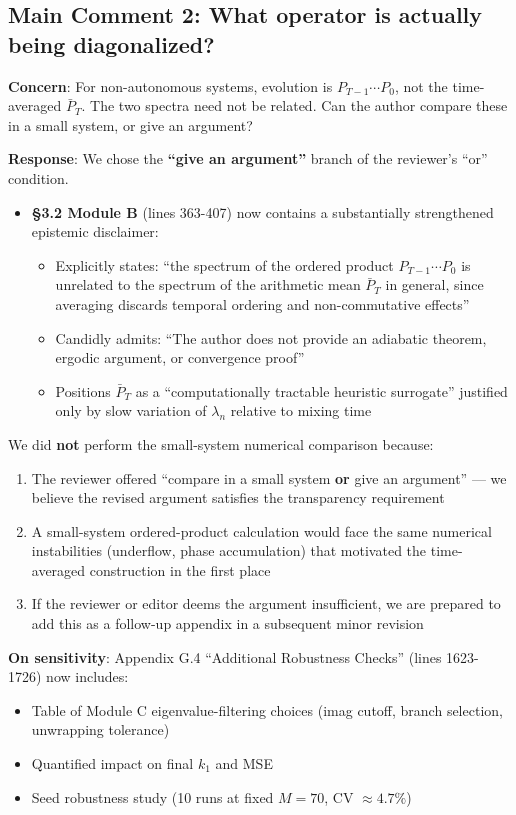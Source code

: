 \documentclass[11pt]{article}
\begin{document}
\subsection*{Main Comment 2: What operator is actually being diagonalized?}

\textbf{Concern}: For non-autonomous systems, evolution is $P_{T-1}\cdots P_0$, not the time-averaged $\bar{P}_T$. The two spectra need not be related. Can the author compare these in a small system, or give an argument?

\textbf{Response}: We chose the \textbf{``give an argument''} branch of the reviewer's ``or'' condition.

\begin{itemize}[leftmargin=2em]
\item \textbf{\S3.2 Module B} (lines 363-407) now contains a substantially strengthened epistemic disclaimer:
\begin{itemize}
\item Explicitly states: ``the spectrum of the ordered product $P_{T-1}\cdots P_0$ is unrelated to the spectrum of the arithmetic mean $\bar{P}_T$ in general, since averaging discards temporal ordering and non-commutative effects''
\item Candidly admits: ``The author does not provide an adiabatic theorem, ergodic argument, or convergence proof''
\item Positions $\bar{P}_T$ as a ``computationally tractable heuristic surrogate'' justified only by slow variation of $\lambda_n$ relative to mixing time
\end{itemize}
\end{itemize}

We did \textbf{not} perform the small-system numerical comparison because:
\begin{enumerate}
\item The reviewer offered ``compare in a small system \textbf{or} give an argument'' --- we believe the revised argument satisfies the transparency requirement
\item A small-system ordered-product calculation would face the same numerical instabilities (underflow, phase accumulation) that motivated the time-averaged construction in the first place
\item If the reviewer or editor deems the argument insufficient, we are prepared to add this as a follow-up appendix in a subsequent minor revision
\end{enumerate}

\textbf{On sensitivity}: Appendix G.4 ``Additional Robustness Checks'' (lines 1623-1726) now includes:
\begin{itemize}
\item Table of Module C eigenvalue-filtering choices (imag cutoff, branch selection, unwrapping tolerance)
\item Quantified impact on final $k_1$ and MSE
\item Seed robustness study (10 runs at fixed $M=70$, CV $\approx 4.7\%$)
\end{itemize}
\end{document}

